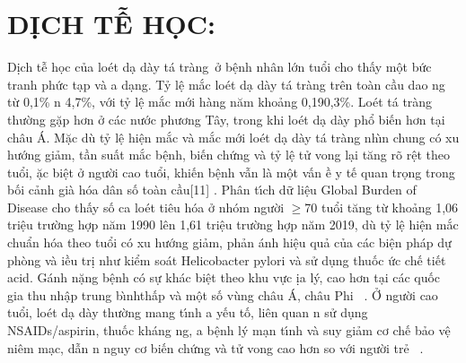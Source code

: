 \documentclass[9pt,twocolumn]{article}
\begin{document}
    
\section*
  {\textbf{D\d{I}CH TỄ H\d{O}C:}}
D\d{i}ch t{\~{\^e}} h\d{o}c của lo{\'e}t d{\d{a}} d\`{a}y t\'{a} tr\`{a}ng~ở b{\^{\d{e}}}nh nh\^{a}n lớn tuổi cho thấy m{\^{\d{o}}}t bức tranh phức t{\d{a}}p v\`{a} \text{\dj}a d{\d{a}}ng. Tỷ l{\^{\d{e}}} mắc lo{\'e}t d{\d{a}} d\`{a}y t\'{a} tr\`{a}ng tr{\^{e}}n to\`{a}n cầu dao ng từ 0,1\% n 4,7\%, với tỷ l{\^{\d{e}}} mắc mới h\`{a}ng n{\u{a}}m khoảng 0,19{\textendash}0,3\%. Lo{\'e}t t\'{a} tr\`{a}ng thường gặp hơn ở c\'{a}c nước phương T\^{a}y, trong khi lo{\'e}t d{\d{a}} d\`{a}y phổ bi{{\'{\^{e}}}}n hơn t{\d{a}}i ch\^{a}u \'{A}. Mặc d\`{u} tỷ l{\^{\d{e}}} hi{\^{\d{e}}}n mắc v\`{a} mắc mới lo{\'e}t d{\d{a}} d\`{a}y {\textendash} t\'{a} tr\`{a}ng nh\`{\i}n chung c{\'{o}} xu hướng giảm, tần suất mắc b{\^{\d{e}}}nh, bi{{\'{\^{e}}}}n chứng v\`{a} tỷ l{\^{\d{e}}} tử vong l{\d{a}}i t{\u{a}}ng r{\~{o}} r{\^{\d{e}}}t theo tuổi, \text{\dj}ặc bi{\^{\d{e}}}t ở người cao tuổi, khi{{\'{\^{e}}}}n b{\^{\d{e}}}nh vẫn l\`{a} m{\^{\d{o}}}t vấn \text{\dj}ề y t{{\'{\^{e}}}} quan tr\d{o}ng trong bối cảnh gi\`{a} h{\'{o}}a d\^{a}n số to\`{a}n cầu[11] . Ph\^{a}n t\'{\i}ch dữ li{\^{\d{e}}}u Global Burden of Disease cho thấy số ca lo{\'e}t ti{\^{e}}u h{\'{o}}a ở nh{\'{o}}m người \ensuremath{\geq }70 tuổi t{\u{a}}ng từ khoảng 1,06 tri{\^{\d{e}}}u trường hợp n{\u{a}}m 1990 l{\^{e}}n 1,61 tri{\^{\d{e}}}u trường hợp n{\u{a}}m 2019, d\`{u} tỷ l{\^{\d{e}}} hi{\^{\d{e}}}n mắc chuẩn h{\'{o}}a theo tuổi c{\'{o}} xu hướng giảm, phản \'{a}nh hi{\^{\d{e}}}u quả của c\'{a}c bi{\^{\d{e}}}n ph\'{a}p dự ph\`{o}ng v\`{a} \text{\dj}iều tr\d{i} như kiểm so\'{a}t Helicobacter pylori v\`{a} sử d\d{u}ng thuốc ức ch{{\'{\^{e}}}} ti{{\'{\^{e}}}}t acid. G\'{a}nh nặng b{\^{\d{e}}}nh c{\'{o}} sự kh\'{a}c bi{\^{\d{e}}}t theo khu vực \text{\dj}\d{i}a l\'{y}, cao hơn t{\d{a}}i c\'{a}c quốc gia thu nh{\^{\d{a}}}p trung b\`{\i}nh{\textendash}thấp v\`{a} m{\^{\d{o}}}t số v\`{u}ng ch\^{a}u \'{A}, ch\^{a}u Phi\unskip~\cite{2901310:34531809} . Ở người cao tuổi, lo{\'e}t d{\d{a}} d\`{a}y thường mang t\'{\i}nh \text{\dj}a y{{\'{\^{e}}}}u tố, li{\^{e}}n quan n sử d\d{u}ng NSAIDs/aspirin, thuốc kh\'{a}ng ng, \text{\dj}a b{\^{\d{e}}}nh l\'{y} m{\d{a}}n t\'{\i}nh v\`{a} suy giảm cơ ch{{\'{\^{e}}}} bảo v{\^{\d{e}}} ni{\^{e}}m m{\d{a}}c, dẫn n nguy cơ bi{{\'{\^{e}}}}n chứng v\`{a} tử vong cao hơn so với người trẻ\unskip~\cite{2901310:34531809,2901310:34531810} .
    
\end{document}
